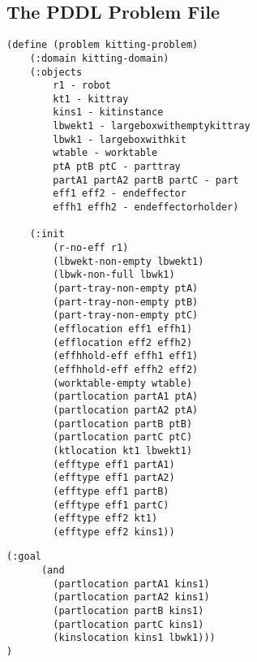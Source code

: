 \begin{appendices}
\section{The PDDL Problem File}\label{appendix:B}

\begin{minipage}{.5\paperwidth}
\begin{mylisting}
\begin{Verbatim}[commandchars=\\\{\},commandchars=+\[\],fontsize=\small,numbersep=3pt]	
(define (problem kitting-problem)
	(:domain kitting-domain)
	(:objects
		r1 - robot
		kt1 - kittray
		kins1 - kitinstance
		lbwekt1 - largeboxwithemptykittray
		lbwk1 - largeboxwithkit
		wtable - worktable
		ptA ptB ptC - parttray
		partA1 partA2 partB partC - part
		eff1 eff2 - endeffector
		effh1 effh2 - endeffectorholder)

	(:init
		(r-no-eff r1)
		(lbwekt-non-empty lbwekt1)
		(lbwk-non-full lbwk1)
		(part-tray-non-empty ptA)
		(part-tray-non-empty ptB)
		(part-tray-non-empty ptC)
		(efflocation eff1 effh1)
		(efflocation eff2 effh2)
		(effhhold-eff effh1 eff1)
		(effhhold-eff effh2 eff2)
		(worktable-empty wtable)
		(partlocation partA1 ptA)
		(partlocation partA2 ptA)
		(partlocation partB ptB)
		(partlocation partC ptC)
		(ktlocation kt1 lbwekt1)
		(efftype eff1 partA1)
		(efftype eff1 partA2)
		(efftype eff1 partB)
		(efftype eff1 partC)
		(efftype eff2 kt1)
		(efftype eff2 kins1))
\end{Verbatim}
\end{mylisting}
\end{minipage}


\begin{minipage}{.5\paperwidth}
\begin{mylisting}
\begin{Verbatim}[commandchars=\\\{\},commandchars=+\[\],fontsize=\small,numbersep=3pt]			
	(:goal
	  (and
	    (partlocation partA1 kins1)
	    (partlocation partA2 kins1)
	    (partlocation partB kins1)
	    (partlocation partC kins1)
	    (kinslocation kins1 lbwk1)))
)
\end{Verbatim}
\end{mylisting}
\end{minipage}

\end{appendices} 